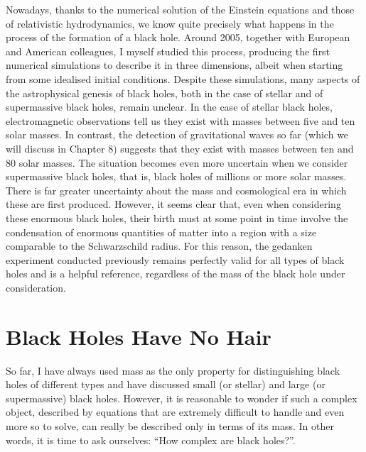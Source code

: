 Nowadays, thanks to the numerical solution of the Einstein equations and those of
relativistic hydrodynamics, we know quite precisely what happens in
the process of the formation of a black hole. Around 2005, together with European and
American colleagues, I myself studied this process, producing the first numerical
simulations to describe it in three dimensions, albeit when starting from some idealised
initial conditions. Despite these simulations, many aspects of the astrophysical genesis
of black holes, both in the case of stellar and of supermassive black holes, remain
unclear. In the case of stellar black holes, electromagnetic
observations tell us they exist with masses between five and ten solar masses. In
contrast, the detection of gravitational waves so far (which we will
discuss in Chapter 8) suggests that they exist with masses between ten and 80 solar
masses. The situation becomes even more uncertain when we consider supermassive black
holes, that is, black holes of millions or more solar masses. There is far greater
uncertainty about the mass and cosmological era in which these are first produced.
However, it seems clear that, even when considering these enormous black holes, their
birth must at some point in time involve the condensation of enormous quantities of
matter into a region with a size comparable to the Schwarzschild radius. For this
reason, the gedanken experiment conducted previously remains perfectly valid for all
types of black holes and is a helpful reference, regardless of the mass of the black
hole under consideration.

\section{Black Holes Have No Hair}\label{sec:06-hair}

So far, I have always used mass as the only property for distinguishing black holes of
different types and have discussed small (or stellar) and large (or
supermassive) black holes. However, it is reasonable to wonder if such
a complex object, described by equations that are extremely difficult to handle and even
more so to solve, can really be described only in terms of its mass. In other words, it
is time to ask ourselves: ``How complex are black holes?''.

